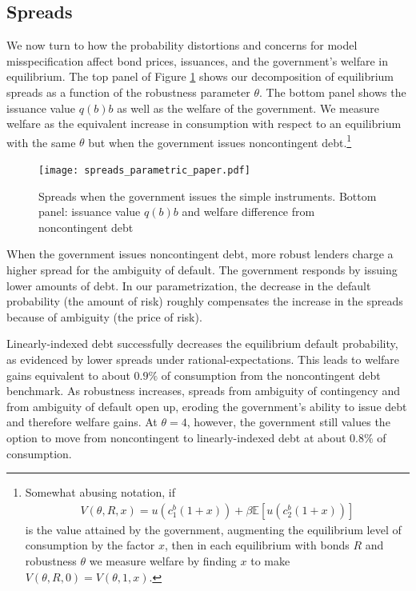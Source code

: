 \subsection{Spreads}\label{sec:spreads}
We now turn to how the probability distortions and concerns for model misspecification affect bond prices, issuances, and the government's welfare in equilibrium. The top panel of Figure \ref{Figure_spreads_parametric} shows our decomposition of equilibrium spreads as a function of the robustness parameter $\theta$. The bottom panel shows the issuance value $q(b)b$ as well as the welfare of the government. We measure welfare as the equivalent increase in consumption with respect to an equilibrium with the same $\theta$ but when the government issues noncontingent debt.\footnote{Somewhat abusing notation, if
\begin{align*}
  V(\theta, R, x) = u\left(c_1^b(1+x)\right) + \beta \mathbb{E}\left[u\left(c_2^b(1+x)\right)\right]
\end{align*}
is the value attained by the government, augmenting the equilibrium level of consumption by the factor $x$, then in each equilibrium with bonds $R$ and robustness $\theta$ we measure welfare by finding $x$ to make $V(\theta, R, 0) = V(\theta, 1, x)$.}
\begin{figure}[!hbtp]\centering
    \texttt{[image: spreads\_parametric\_paper.pdf]}
\caption{Spreads when the government issues the simple instruments. Bottom panel: issuance value $q(b)b$ and welfare difference from noncontingent debt}\label{Figure_spreads_parametric}
\end{figure}

When the government issues noncontingent debt, more robust lenders charge a higher spread for the ambiguity of default. The government responds by issuing lower amounts of debt. In our parametrization, the decrease in the default probability (the amount of risk) roughly compensates the increase in the spreads because of ambiguity (the price of risk).

Linearly-indexed debt successfully decreases the equilibrium default probability, as evidenced by lower spreads under rational-expectations. This leads to welfare gains equivalent to about $0.9\%$ of consumption from the noncontingent debt benchmark. As robustness increases, spreads from ambiguity of contingency and from ambiguity of default open up, eroding the government's ability to issue debt and therefore welfare gains. At $\theta = 4$, however, the government still values the option to move from noncontingent to linearly-indexed debt at about $0.8\%$ of consumption.

